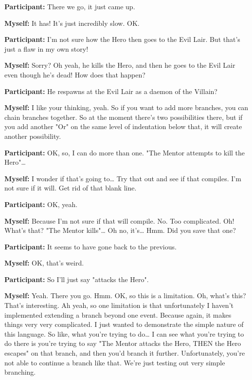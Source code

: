 \documentclass[11pt]{report}
\begin{document}
\begin{linenumbers}
\textbf{Participant:} There we go, it just came up.

\textbf{Myself:} It has! It's just incredibly slow. OK.

\textbf{Participant:} I'm not sure how the Hero then goes to the Evil Lair. But
that's just a flaw in my own story!

\textbf{Myself:} Sorry? Oh yeah, he kills the Hero, and then he goes to the Evil Lair even though he's dead! How does that happen?

\textbf{Participant:} He respawns at the Evil Lair as a daemon of the Villain?

\textbf{Myself:} I like your thinking, yeah. So if you want to add more branches, you can chain branches together. So at the moment there's two possibilities there, but if you add another "Or" on the same level of indentation below that, it will create another possibility.

\textbf{Participant:} OK, so, I can do more than one. "The Mentor attempts to kill the Hero"\ldots{}

\textbf{Myself:} I wonder if that's going to\ldots{} Try that out and see if that compiles. I'm not sure if it will. Get rid of that blank line.

\textbf{Participant:} OK, yeah.

\textbf{Myself:} Because I'm not sure if that will compile. No. Too complicated. Oh! What's that? "The Mentor kills"\ldots{} Oh no, it's\ldots{} Hmm. Did you save that one?

\textbf{Participant:} It seems to have gone back to the previous.

\textbf{Myself:} OK, that's weird.

\textbf{Participant:} So I'll just say "attacks the Hero".

\textbf{Myself:} Yeah. There you go. Hmm. OK, so this is a limitation. Oh,
what's this? That's interesting. Ah yeah, so one limitation is that
unfortunately I haven't implemented extending a branch beyond one event. Because
again, it makes things very very complicated. I just wanted to demonstrate the
simple nature of this language. So like, what you're trying to do\ldots{} I can
see what you're trying to do there is you're trying to say "The Mentor attacks
the Hero, THEN the Hero escapes" on that branch, and then you'd branch it
further. Unfortunately, you're not able to continue a branch like that. We're
just testing out very simple branching.


\end{linenumbers}
\end{document}
